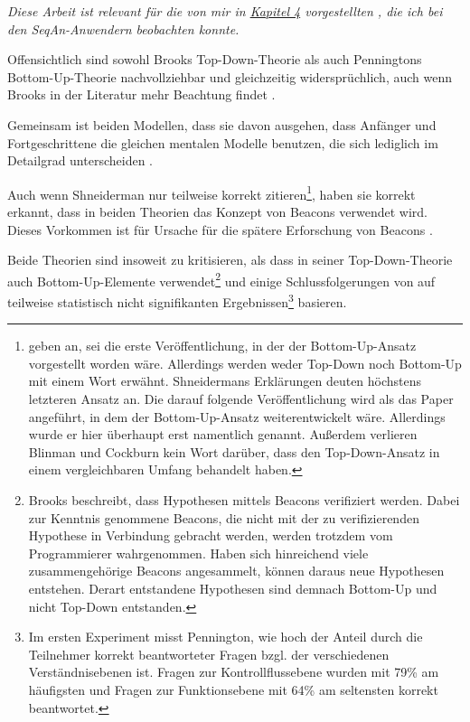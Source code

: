 \begin{important}
\textit{Diese Arbeit ist relevant für die von mir in \href{sec:Ergebnisse}{Kapitel 4} vorgestellten , die ich bei den SeqAn-Anwendern beobachten konnte.}

Offensichtlich sind sowohl Brooks Top-Down-Theorie als auch Penningtons Bottom-Up-Theorie nachvollziehbar und gleichzeitig widersprüchlich, auch wenn Brooks in der Literatur mehr Beachtung findet \citep{Shaft:1998tc}.

Gemeinsam ist beiden Modellen, dass sie davon ausgehen, dass Anfänger und Fortgeschrittene die gleichen mentalen Modelle benutzen, die sich lediglich im Detailgrad unterscheiden \citep{Corritore:1999bd}.

Auch wenn \cite{Blinman:2005wr} Shneiderman nur teilweise korrekt zitieren\footnote{\cite{Blinman:2005wr} geben an, \cite{Shneiderman:1977jj} sei die erste Veröffentlichung, in der der Bottom-Up-Ansatz vorgestellt worden wäre. Allerdings werden weder Top-Down noch Bottom-Up mit einem Wort erwähnt. Shneidermans Erklärungen deuten höchstens letzteren Ansatz an. Die darauf folgende Veröffentlichung \citep{BenShneiderman:gn} wird als das Paper angeführt, in dem der Bottom-Up-Ansatz weiterentwickelt wäre. Allerdings wurde er hier überhaupt erst namentlich genannt. Außerdem verlieren Blinman und Cockburn kein Wort darüber, dass \cite{BenShneiderman:gn} den Top-Down-Ansatz in einem vergleichbaren Umfang behandelt haben.}, haben sie korrekt erkannt, dass in beiden Theorien das Konzept von Beacons verwendet wird. Dieses Vorkommen ist für \cite{Blinman:2005wr} Ursache für die spätere Erforschung von Beacons \citep{Wiedenbeck:1986fc,Gellenbeck:1991vn,Wiedenbeck:1991ez,Crosby02theroles,4660352}.

Beide Theorien sind insoweit zu kritisieren, als dass \cite{Brooks:1983fj} in seiner Top-Down-Theorie auch Bottom-Up-Elemente verwendet\footnote{Brooks beschreibt, dass Hypothesen mittels Beacons verifiziert werden. Dabei zur Kenntnis genommene Beacons, die nicht mit der zu verifizierenden Hypothese in Verbindung gebracht werden, werden trotzdem vom Programmierer wahrgenommen. Haben sich hinreichend viele zusammengehörige Beacons angesammelt, können daraus neue Hypothesen entstehen. Derart entstandene Hypothesen sind demnach Bottom-Up und nicht Top-Down entstanden.} und einige Schlussfolgerungen von \cite{Pennington:1987dc} auf teilweise statistisch nicht signifikanten Ergebnissen\footnote{Im ersten Experiment misst Pennington, wie hoch der Anteil durch die Teilnehmer korrekt beantworteter Fragen bzgl. der verschiedenen Verständnisebenen ist. Fragen zur Kontrollflussebene wurden mit 79\% am häufigsten und Fragen zur Funktionsebene mit 64\% am seltensten korrekt beantwortet.} basieren.


\end{important}
